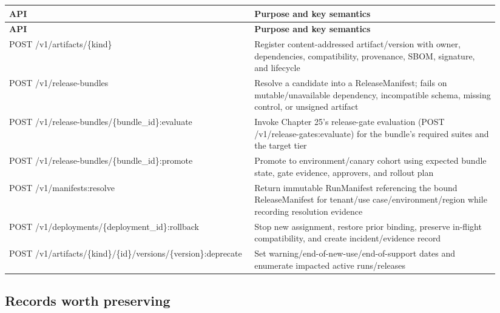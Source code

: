 \BookTableStart
\small
\begin{longtable}{@{}Y{0.4700\linewidth}Y{0.4700\linewidth}@{}}
\color{white}\bfseries \textbf{API} & \color{white}\bfseries \textbf{Purpose and key semantics} \\
\endfirsthead
{}
\color{white}\bfseries \textbf{API} & \color{white}\bfseries \textbf{Purpose and key semantics} \\
\endhead
POST /v1/artifacts/\{kind\} & Register content-addressed artifact/version with owner, dependencies, compatibility, provenance, SBOM, signature, and lifecycle \\
POST /v1/release-bundles & Resolve a candidate into a ReleaseManifest; fails on mutable/unavailable dependency, incompatible schema, missing control, or unsigned artifact \\
POST /v1/release-bundles/\{bundle\_id\}:evaluate & Invoke Chapter 25's release-gate evaluation (POST /v1/release-gates:evaluate) for the bundle's required suites and the target tier \\
POST /v1/release-bundles/\{bundle\_id\}:promote & Promote to environment/canary cohort using expected bundle state, gate evidence, approvers, and rollout plan \\
POST /v1/manifests:resolve & Return immutable RunManifest referencing the bound ReleaseManifest for tenant/use case/environment/region while recording resolution evidence \\
POST /v1/deployments/\{deployment\_id\}:rollback & Stop new assignment, restore prior binding, preserve in-flight compatibility, and create incident/evidence record \\
POST /v1/artifacts/\{kind\}/\{id\}/versions/\{version\}:deprecate & Set warning/end-of-new-use/end-of-support dates and enumerate impacted active runs/releases \\
\end{longtable}
\BookTableEnd

\subsection{Records worth preserving}

